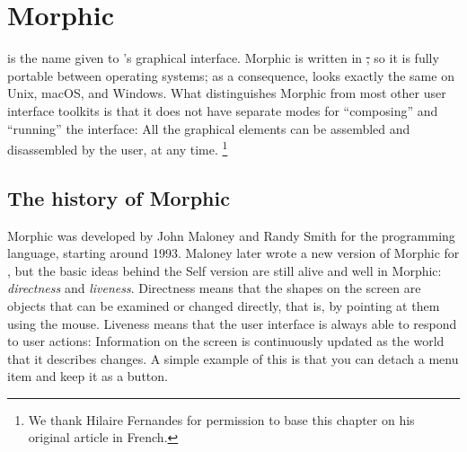 \documentclass[a4paper,10pt,twoside]{book}
\begin{document}
	\renewcommand{\nnbb}[2]{} %
	\sloppy
\fi
\chapter{Morphic}


 is the name given to \sq's graphical interface.
Morphic is written in \st, so it is fully portable between operating systems; as a consequence, \sq looks exactly the same on Unix, macOS, and Windows.
What distinguishes Morphic from most other user interface toolkits is that it does not have separate modes for ``composing'' and ``running'' the interface:
All the graphical elements can be assembled and disassembled by the user, at any time.%
\footnote{We thank Hilaire Fernandes for permission to base this chapter on his original article in French.}



\section{The history of Morphic}

Morphic was developed by John Maloney and Randy Smith for the  programming language, starting around 1993. 
Maloney later wrote a new version of Morphic for \sq, but the basic ideas behind the Self version are still alive and well in \sq Morphic: \emph{directness} and \emph{liveness}.
Directness means that the shapes on the screen are objects that can be examined or changed directly, that is, by pointing at them using the mouse.
Liveness means that the user interface is always able to respond to user actions:
Information on the screen is continuously updated as the world that it describes changes.
A simple example of this is that you can detach a menu item and keep it as a button.
\end{document}
